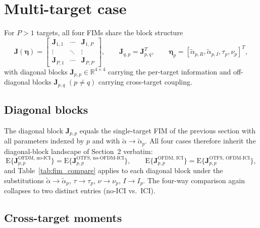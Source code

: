 \documentclass[11pt]{article}
\begin{document}
\section{Multi-target case}

For \(P>1\) targets, all four FIMs share the block structure
\begin{equation}
    \bm{J}(\bm{\eta}) = \begin{bmatrix}
        \bm{J}_{1,1} & \cdots & \bm{J}_{1,P} \\
        \vdots & \ddots & \vdots \\
        \bm{J}_{P,1} & \cdots & \bm{J}_{P,P}
    \end{bmatrix},\qquad
    \bm{J}_{q,p} = \bm{J}_{p,q}^T,\qquad
    \bm{\eta}_p = [\tilde{\alpha}_{p,R},\tilde{\alpha}_{p,I},\tau_p,\nu_p]^T,
\end{equation}
with diagonal blocks \(\bm{J}_{p,p}\in\mathbb{R}^{4\times 4}\) carrying
the per-target information and off-diagonal blocks \(\bm{J}_{p,q}\)
\((p\neq q)\) carrying cross-target coupling.

\subsection*{Diagonal blocks}

The diagonal block \(\bm{J}_{p,p}\) equals the single-target FIM of
the previous section with all parameters indexed by \(p\) and with
\(\tilde{\alpha}\to\tilde{\alpha}_p\). All four cases therefore inherit
the diagonal-block landscape of Section~2 verbatim:
\begin{equation}
    \mathrm{E}\{\bm{J}_{p,p}^{\text{OFDM, no-ICI}}\}
    = \mathrm{E}\{\bm{J}_{p,p}^{\text{OTFS, no-OFDM-ICI}}\},\qquad
    \mathrm{E}\{\bm{J}_{p,p}^{\text{OFDM, ICI}}\}
    = \mathrm{E}\{\bm{J}_{p,p}^{\text{OTFS, OFDM-ICI}}\},
\end{equation}
and Table~\ref{tab:fim_compare} applies to each diagonal block under
the substitutions \(\tilde{\alpha}\to\tilde{\alpha}_p\),
\(\tau\to\tau_p\), \(\nu\to\nu_p\), \(I\to I_p\). The four-way
comparison again collapses to two distinct entries (no-ICI vs.\ ICI).

\subsection*{Cross-target moments}
\end{document}
